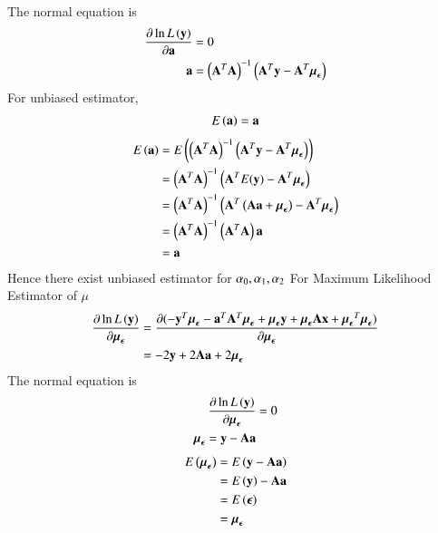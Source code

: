 \documentclass[journal,12pt,onecolumn]{IEEEtran}
\theoremstyle{remark}
\begin{document}
The normal equation is
\begin{align}
\frac{\partial \ln L\left(\mathbf{y}\right)}{\partial \mathbf{a}}&=0\\
\mathbf{a}&=\left({\mathbf{A}}^T\mathbf{A}\right)^{-1}\left({\mathbf{A}}^T\mathbf{y}-\mathbf{A}^T\mathbf{\boldsymbol{\mu}}_{\boldsymbol{{\epsilon}}}\right)
\end{align}
For unbiased estimator, 
\begin{align}
E\left(\mathbf{a}\right)=\mathbf{a}
\end{align}
\begin{align}
E\left(\mathbf{a}\right)&=E\left(\left({\mathbf{A}}^T\mathbf{A}\right)^{-1}\left({\mathbf{A}}^T\mathbf{y}-\mathbf{A}^T\mathbf{\boldsymbol{\mu}}_{\boldsymbol{{\epsilon}}}\right)\right)\\
&=\left({\mathbf{A}}^T\mathbf{A}\right)^{-1}\left({\mathbf{A}}^TE(\mathbf{y})-\mathbf{A}^T\mathbf{\boldsymbol{\mu}}_{\boldsymbol{{\epsilon}}}\right)\\
&=\left({\mathbf{A}}^T\mathbf{A}\right)^{-1}\left({\mathbf{A}}^T\left(\mathbf{A}\mathbf{a}+\mathbf{\boldsymbol{\mu}}_{\boldsymbol{{\epsilon}}}\right)-\mathbf{A}^T\mathbf{\boldsymbol{\mu}}_{\boldsymbol{{\epsilon}}}\right)\\
&=\left({\mathbf{A}}^T\mathbf{A}\right)^{-1}\left({\mathbf{A}}^T\mathbf{A}\right)\mathbf{a}\\
&=\mathbf{a}
\end{align}
Hence there exist unbiased estimator for ${\alpha}_0, {\alpha}_1, {\alpha}_2\\$
For Maximum Likelihood Estimator of $\mu$
\begin{align}
\frac{\partial \ln L\left(\mathbf{y}\right)}{\partial \mathbf{\boldsymbol{\mu}}_{\boldsymbol{{\epsilon}}}}&=\frac{\partial (-\mathbf{y}^T\mathbf{\boldsymbol{\mu}}_{\boldsymbol{{\epsilon}}}-\mathbf{a}^T\mathbf{A}^T\mathbf{\boldsymbol{\mu}}_{\boldsymbol{{\epsilon}}}+\mathbf{\boldsymbol{\mu}}_{\boldsymbol{{\epsilon}}}\mathbf{y}+\mathbf{\boldsymbol{\mu}}_{\boldsymbol{{\epsilon}}}\mathbf{A}\mathbf{x}+{\mathbf{\boldsymbol{\mu}}_{\boldsymbol{{\epsilon}}}}^T\mathbf{\boldsymbol{\mu}}_{\boldsymbol{{\epsilon}}})}{\partial \mathbf{\boldsymbol{\mu}}_{\boldsymbol{{\epsilon}}}}\\
&=-2\mathbf{y}+2\mathbf{A}\mathbf{a}+2\mathbf{\boldsymbol{\mu}}_{\boldsymbol{{\epsilon}}}
\end{align}
The normal equation is
\begin{align}
\frac{\partial \ln L\left(\mathbf{y}\right)}{\partial \mathbf{\boldsymbol{\mu}}_{\boldsymbol{{\epsilon}}}}&=0\\
\mathbf{\boldsymbol{\mu}}_{\boldsymbol{{\epsilon}}}=\mathbf{y}-\mathbf{A}\mathbf{a}
\end{align}
\begin{align}
E\left(\mathbf{\boldsymbol{\mu}}_{\boldsymbol{{\epsilon}}}\right)&=E\left(\mathbf{y}-\mathbf{A}\mathbf{a}\right)\\
&=E\left(\mathbf{y}\right)-\mathbf{A}\mathbf{a}\\
&=E\left(\boldsymbol{{\epsilon}}\right)\\
&=\mathbf{\boldsymbol{\mu}}_{\boldsymbol{{\epsilon}}}
\end{align}
\end{document}
